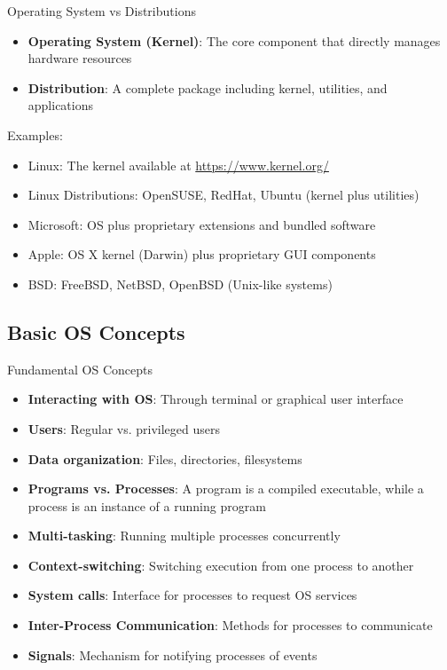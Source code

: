 \begin{definition}{Operating System vs Distributions}\\
    \begin{itemize}
        \item \textbf{Operating System (Kernel)}: The core component that directly manages hardware resources
        \item \textbf{Distribution}: A complete package including kernel, utilities, and applications
    \end{itemize}
    
    Examples:
    \begin{itemize}
        \item Linux: The kernel available at \url{https://www.kernel.org/}
        \item Linux Distributions: OpenSUSE, RedHat, Ubuntu (kernel plus utilities)
        \item Microsoft: OS plus proprietary extensions and bundled software
        \item Apple: OS X kernel (Darwin) plus proprietary GUI components
        \item BSD: FreeBSD, NetBSD, OpenBSD (Unix-like systems)
    \end{itemize}
\end{definition}

\subsection{Basic OS Concepts}

\begin{definition}{Fundamental OS Concepts}\\
    \begin{itemize}
        \item \textbf{Interacting with OS}: Through terminal or graphical user interface
        \item \textbf{Users}: Regular vs. privileged users
        \item \textbf{Data organization}: Files, directories, filesystems
        \item \textbf{Programs vs. Processes}: A program is a compiled executable, while a process is an instance of a running program
        \item \textbf{Multi-tasking}: Running multiple processes concurrently
        \item \textbf{Context-switching}: Switching execution from one process to another
        \item \textbf{System calls}: Interface for processes to request OS services
        \item \textbf{Inter-Process Communication}: Methods for processes to communicate
        \item \textbf{Signals}: Mechanism for notifying processes of events
    \end{itemize}
\end{definition}

